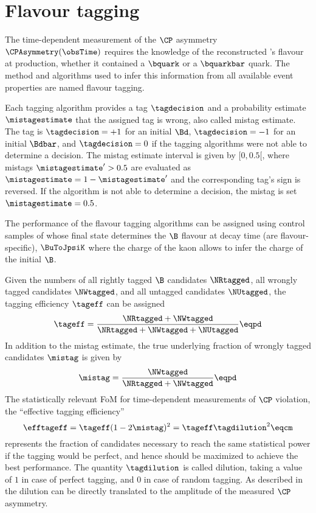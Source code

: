 
\chapter{Flavour tagging}
\label{ch:flavour_tagging}

The time-dependent measurement of the $\CP$ asymmetry $\CPAsymmetry(\obsTime)$
requires the knowledge of the reconstructed \Bmeson's flavour at production, \ie
whether it contained a $\bquark$ or a $\bquarkbar$ quark. The method and
algorithms used to infer this information from all available event properties
are named flavour tagging.

Each tagging algorithm provides a tag $\tagdecision$ and a probability estimate
$\mistagestimate$ that the assigned tag is wrong, also called mistag estimate.
The tag is $\tagdecision=+1$ for an initial $\Bd$, $\tagdecision=-1$ for an
initial $\Bdbar$, and $\tagdecision=0$ if the tagging algorithms were not able
to determine a decision. The mistag estimate interval is given by ${[0,0.5[}$,
where mistags $\mistagestimate^{\prime}>0.5$ are evaluated as $\mistagestimate =
1 - \mistagestimate^{\prime}$ and the corresponding tag's sign is reversed. If
the algorithm is not able to determine a decision, the mistag is set
$\mistagestimate=0.5$.

The performance of the flavour tagging algorithms can be assigned using control
samples of \Bmesons whose final state determines the $\B$ flavour at decay time
(\ie are flavour-specific), \eg $\BuToJpsiK$ where the charge of the kaon allows
to infer the charge of the initial $\B$.

Given the numbers of all rightly tagged $\B$ candidates $\NRtagged$, all wrongly
tagged candidates $\NWtagged$, and all untagged candidates $\NUtagged$, the
tagging efficiency $\tageff$ can be assigned
%
\begin{equation}\label{eq:flavour_tagging:tageff}
  \tageff = \frac{\NRtagged + \NWtagged}{\NRtagged + \NWtagged + \NUtagged}\eqpd
\end{equation}
%
In addition to the mistag estimate, the true underlying fraction of wrongly
tagged candidates $\mistag$ is given by
%
\begin{equation}\label{eq:flavour_tagging:mistag}
  \mistag = \frac{\NWtagged}{\NRtagged + \NWtagged}\eqpd
\end{equation}
%
The statistically relevant \acl{FoM} for time-dependent measurements of $\CP$
violation, the \enquote{effective tagging efficiency}
%
\begin{equation}\label{eq:flavour_tagging:efftageff}
  \efftageff = \tageff(1 - 2 \mistag)^2 = \tageff \tagdilution^2 \eqcm
\end{equation}
%
represents the fraction of candidates necessary to reach the same statistical
power if the tagging would be perfect, and hence should be maximized to achieve
the best performance. The quantity $\tagdilution$ is called dilution, taking a
value of $1$ in case of perfect tagging, and $0$ in case of random tagging. As
described \eg in \Ref~\cite[][Ch. 10.3]{Bevan:2014iga} the dilution can be
directly translated to the amplitude of the measured $\CP$ asymmetry.

